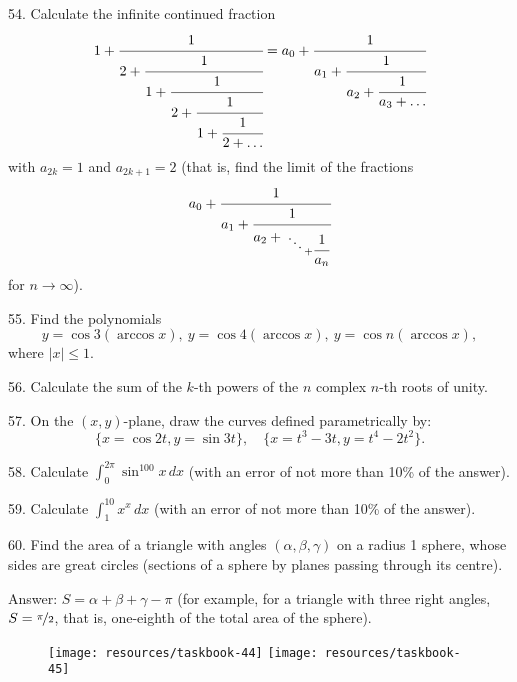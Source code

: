 \begin{problem}{54.}
Calculate the infinite continued fraction
\begin{equation*}
	1+\cfrac{1}{2+\cfrac{1}{1+\cfrac{1}{2+\cfrac{1}{1+\cfrac{1}{2+\ldots}}}}}=
	a_0+\cfrac{1}{a_1+\cfrac{1}{a_2+\cfrac{1}{a_3+\dots}}}
\end{equation*}
with $a_{2k}=1$ and $a_{2k+1}=2$ (that is, find the limit of the fractions
\begin{equation*}
	a_0+\cfrac{1}{a_1+\cfrac{1}{a_2+{\atop{\ddots \atop {}} + \cfrac{1}{a_n}}}}
\end{equation*}
for $n \to \infty$).
\end{problem}

\begin{problem}{55.}
Find the polynomials
\begin{equation*}
	y=\cos 3 (\arccos x),\ y=\cos 4 (\arccos x),\
	y=\cos n (\arccos x),
\end{equation*}
where $|x| \leqslant 1$.
\end{problem}

\begin{problem}{56.}
Calculate the sum of the $k$-th powers of the $n$ complex  $n$-th roots of unity.
\end{problem}

\begin{problem}{57.}
On the $(x,y)$-plane, draw the curves defined parametrically by:
\begin{equation*}
	\{x=\cos 2t, y=\sin 3t\},\quad
	\{x=t^3-3t, y=t^4-2t^2\}.
\end{equation*}
\vspace{-2\baselineskip}%
\end{problem}

\begin{problem}{58.}
Calculate $\int_0^{2\pi} \sin^{100} x\,dx$ (with an error of not more than 10\% of the answer).
\end{problem}

\begin{problem}{59.}
Calculate $\int_1^{10} x^x\,dx$ (with an error of not more than 10\% of the answer).
\end{problem}

\begin{problem}{60.}
Find the area of a triangle with angles $(\alpha, \beta, \gamma)$ on a radius 1 sphere,
whose sides are great circles (sections of a sphere by planes passing through its centre).

\begin{note}{Answer:}
	$S=\alpha+\beta+\gamma-\pi$ (for example, for a triangle with
	three right angles, $S=\nicefrac{\pi}{2}$, that is, one-eighth of the total area of the sphere).
	\begin{figure}
		\null\hfill
		\texttt{[image: resources/taskbook-44]}
		\hfill
		\texttt{[image: resources/taskbook-45]}
		\hfill\null
	\end{figure}
\end{note}
\end{problem}

